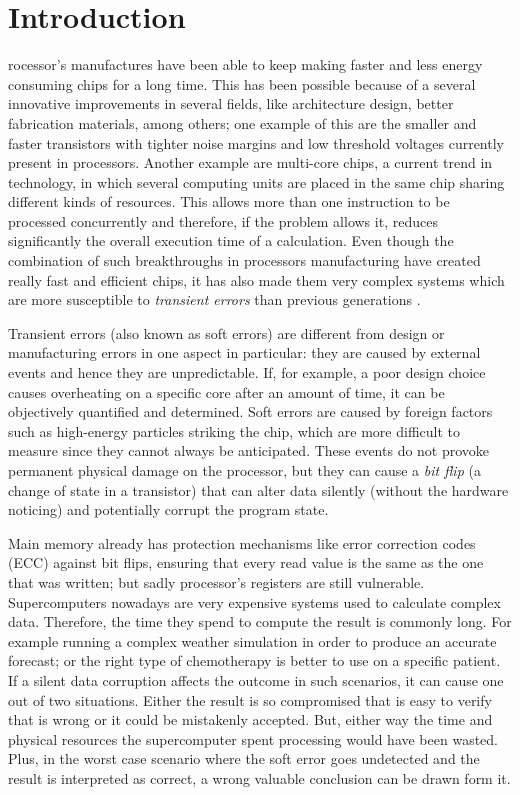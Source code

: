 %
%
\let\textcircled=\pgftextcircled
\chapter{Introduction}
\label{chap:intro}

rocessor's manufactures have been able to keep making faster and less energy consuming chips for a long time. This has been possible because of a several innovative improvements in several fields, like architecture design, better fabrication materials, among others; one example of this are the smaller and faster transistors with tighter noise margins and low threshold voltages currently present in processors. Another example are multi-core chips, a current trend in technology, in which several computing units are placed in the same chip sharing different kinds of resources. This allows more than one instruction to be processed concurrently and therefore, if the problem allows it, reduces significantly the overall execution time of a calculation. Even though the combination of such breakthroughs in processors manufacturing have created really fast and efficient chips, it has also made them very complex systems which are more susceptible to \textit{transient errors} than previous generations \cite{reis2005swift}.

Transient errors (also known as soft errors) are different from design or manufacturing errors in one aspect in particular: they are caused by external events and hence they are unpredictable. If, for example, a poor design choice causes overheating on a specific core after an amount of time, it can be objectively quantified and determined. Soft errors are caused by foreign factors such as high-energy particles striking the chip, which are more difficult to measure since they cannot always be anticipated. These events do not provoke permanent physical damage on the processor, but they can cause a \textit{bit flip} (a change of state in a transistor) that can alter data silently (without the hardware noticing) and potentially corrupt the program state. 

Main memory already has protection mechanisms like error correction codes (ECC) against bit flips, ensuring that every read value is the same as the one that was written; but sadly processor's registers are still vulnerable. Supercomputers nowadays are very expensive systems used to calculate complex data. Therefore, the time they spend to compute the result is commonly long. For example running a complex weather simulation in order to produce an accurate forecast; or the right type of chemotherapy is better to use on a specific patient. If a silent data corruption affects the outcome in such scenarios, it can cause one out of two situations. Either the result is so compromised that is easy to verify that is wrong or it could be mistakenly accepted. But, either way the time and physical resources the supercomputer spent processing would have been wasted. Plus, in the worst case scenario where the soft error goes undetected and the result is interpreted as correct, a wrong valuable conclusion can be drawn form it.

